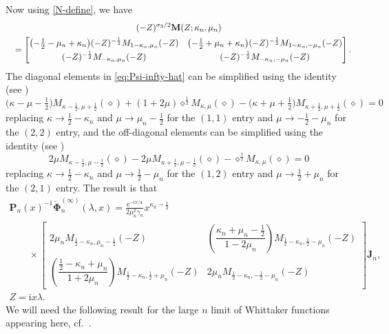 \documentclass[pdftex]{sigma}
\numberwithin{equation}{section}
\newcommand{\ee}{\mathrm{e}}
\newcommand{\ii}{\mathrm{i}}
\newcommand{\para}[1]{\breve{#1}}
\begin{document}
Now using \eqref{N-define}, we have
\begin{gather*}
 (-Z)^{\sigma_3/2}\mathbf{M}(Z;\kappa_n,\mu_n) \\
 \quad=
 \begin{bmatrix}
 \bigl(-\frac{1}{2} - \mu_n+\kappa_n\bigr)(-Z)^{-\frac{1}{2}}M_{1-\kappa_n,\mu_n}(-Z) & \bigl(-\frac{1}{2}+\mu_n+\kappa_n\bigr)(-Z)^{-\frac{1}{2}}M_{1-\kappa_n,-\mu_n}(-Z)\vspace{1mm}\\
 (-Z)^{-\frac{1}{2}}M_{-\kappa_n,\mu_n}(-Z) & (-Z)^{-\frac{1}{2}}M_{-\kappa_n,-\mu_n}(-Z)
 \end{bmatrix}.
\end{gather*}
The diagonal elements in \eqref{eq:Psi-infty-hat} can be simplified using the identity (see \cite[equation~(13.15.3)]{DLMF})
\begin{equation*}
 \big(\kappa-\mu-\tfrac{1}{2}\big)M_{\kappa-\frac{1}{2},\mu+\frac{1}{2}}(\diamond)+(1+2\mu)\diamond^{\frac{1}{2}}M_{\kappa,\mu}(\diamond) -\big(\kappa+\mu+\tfrac{1}{2}\big)M_{\kappa+\frac{1}{2},\mu+\frac{1}{2}}(\diamond)=0
\end{equation*}
replacing $\kappa\to\frac{1}{2}-\kappa_n$ and $\mu\to\mu_n-\frac{1}{2}$ for the $(1,1)$ entry and $\mu\to-\frac{1}{2}-\mu_n$ for the $(2,2)$ entry,
and the off-diagonal elements can be simplified using the identity (see \cite[equation~(13.15.4)]{DLMF})
\begin{equation*}
 2\mu M_{\kappa-\frac{1}{2},\mu-\frac{1}{2}}(\diamond)-2\mu M_{\kappa+\frac{1}{2},\mu-\frac{1}{2}}(\diamond)-\diamond^{\frac{1}{2}}M_{\kappa,\mu}(\diamond)=0
\end{equation*}
replacing $\kappa \to \frac{1}{2}-\kappa_n$ and $\mu\to\frac{1}{2}-\mu_n$ for the $(1,2)$ entry and $\mu\to\frac{1}{2}+\mu_n$ for the $(2,1)$ entry. The result is that
\begin{gather}
 \mathbf{P}_n(x)^{-1}\para{\mathbf{\Phi}}_n^{(\infty)}(\lambda,x)
 =\frac{\ee^{-\ii\pi/4}}{2 \mu_n^2 \gamma_n}x^{\kappa_n-\frac{1}{2}}\nonumber\\
 \qquad {}\times\begin{bmatrix}2\mu_n M_{\frac{1}{2}-\kappa_n,\mu_n-\frac{1}{2}}(-Z) & \left(\dfrac{\kappa_n + \mu_n - \frac{1}{2}}{1 - 2\mu_n}\right) M_{\frac{1}{2}-\kappa_n,\frac{1}{2}-\mu_n}(-Z) \\
 \left(\dfrac{\frac{1}{2} - \kappa_n + \mu_n}{1 + 2\mu_n}\right)M_{\frac{1}{2}-\kappa_n,\frac{1}{2}+\mu_n}(-Z) & 2\mu_n M_{\frac{1}{2}-\kappa_n,-\frac{1}{2}-\mu_n}(-Z)\end{bmatrix}\mathbf{J}_n,\nonumber\\ Z=\ii x\lambda.
 \label{eq:Psi-infty-hat-1}
\end{gather}
We will need the following result for the large $n$ limit of Whittaker functions appearing here, cf.~\cite[equation~(13.21.1)]{DLMF}.
\end{document}
